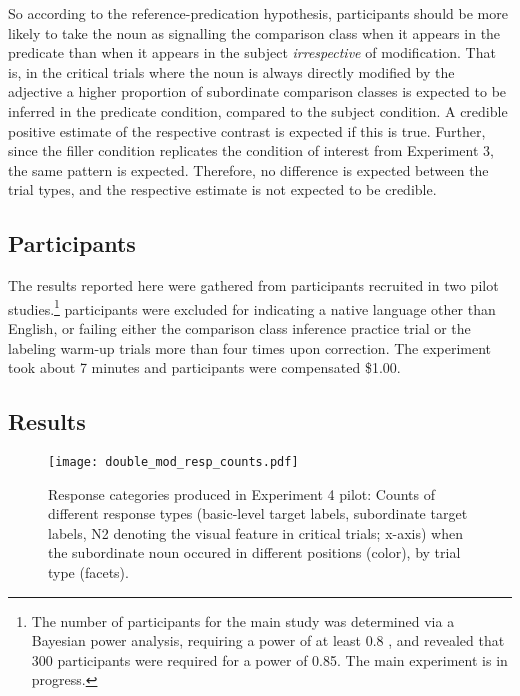So according to the reference-predication hypothesis, participants should be more likely to take the noun as signalling the comparison class when it appears in the predicate than when it appears in the subject \emph{irrespective} of modification. That is, in the critical trials where the noun is always directly modified by the adjective a higher proportion of subordinate comparison classes is expected to be inferred in the predicate condition, compared to the subject condition. A credible positive estimate of the respective contrast is expected if this is true. Further, since the filler condition replicates the condition of interest from Experiment 3, the same pattern is expected. Therefore, no difference is expected between the trial types, and the respective estimate is not expected to be credible.     

\subsection{Participants}
The results reported here were gathered from  participants recruited in two pilot studies.\footnote{The number of participants for the main study was determined via a Bayesian power analysis, requiring a power of at least 0.8 \parencite{kruschke2014doing, powerKurz}, and revealed that 300 participants were required for a power of 0.85. The main experiment is in progress.}  participants were excluded for indicating a native language other than English, or failing either the comparison class inference practice trial or the labeling warm-up trials more than four times upon correction. The experiment took about 7 minutes and participants were compensated \$1.00.   
 
\subsection{Results}
\begin{figure*}[t]
	\begin{center}
		\texttt{[image: double\_mod\_resp\_counts.pdf]}
	\end{center}
	\vspace{-0.3cm}
	\caption{Response categories produced in Experiment 4 pilot: Counts of different response types (basic-level target labels, subordinate target labels, N2 denoting the visual feature in critical trials; x-axis) when the subordinate noun occured in different positions (color),  by trial type (facets).}
	\label{double-mod-results}
\end{figure*}


